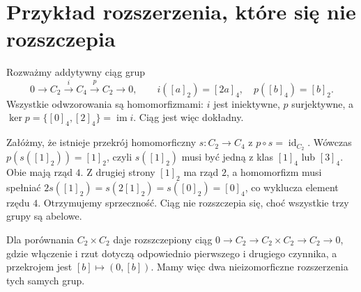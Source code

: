 \section{Przykład rozszerzenia, które się nie rozszczepia}
\begin{przyklad}
\label{aa:prz:c4-nonsplit}
Rozważmy addytywny ciąg grup
\[
 0\longrightarrow C_2\xrightarrow{i}C_4
 \xrightarrow{p}C_2\longrightarrow0,
 \qquad i([a]_2)=[2a]_4,\quad p([b]_4)=[b]_2.
\]
Wszystkie odwzorowania są homomorfizmami:
$i$ jest iniektywne, $p$ surjektywne,
a $\ker p=\{[0]_4,[2]_4\}=\operatorname{im}i$.
Ciąg jest więc dokładny.

Załóżmy, że istnieje przekrój homomorficzny
$s:C_2\to C_4$ z $p\circ s=\operatorname{id}_{C_2}$.
Wówczas $p(s([1]_2))=[1]_2$, czyli $s([1]_2)$
musi być jedną z klas $[1]_4$ lub $[3]_4$.
Obie mają rząd $4$. Z drugiej strony $[1]_2$ ma rząd $2$,
a homomorfizm musi spełniać
$2s([1]_2)=s(2[1]_2)=s([0]_2)=[0]_4$,
co wyklucza element rzędu $4$. Otrzymujemy sprzeczność.
Ciąg nie rozszczepia się, choć wszystkie trzy grupy są abelowe.

Dla porównania $C_2\times C_2$ daje rozszczepiony ciąg
$0\to C_2\to C_2\times C_2\to C_2\to0$,
gdzie włączenie i rzut dotyczą odpowiednio pierwszego
i drugiego czynnika, a przekrojem jest $[b]\mapsto(0,[b])$.
Mamy więc dwa nieizomorficzne rozszerzenia tych samych grup.
\end{przyklad}

